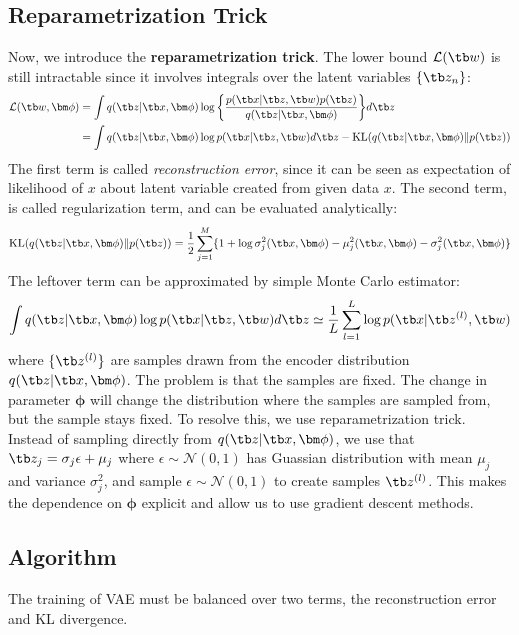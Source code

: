 \documentclass{article}
\begin{document}
    \subsection{Reparametrization Trick}
        Now, we introduce the \textbf{reparametrization trick}. The lower bound $\mathcal{L}(\tb w)$ is still intractable since it involves integrals over the latent
        variables $\{\tb z_n\}$:
        \begin{align*}
            \mathcal{L}(\tb w,\bm\phi)&=\int q(\tb z|\tb x, \bm\phi)\log{\left\{ \frac{p(\tb x|\tb z, \tb w)p(\tb z)}{q(\tb z|\tb x, \bm\phi)} \right\}}d\tb z
            \\ &=\int q(\tb z|\tb x,\bm\phi)\log{p(\tb x|\tb z,\tb w)}d\tb z - \text{KL}(q(\tb z|\tb x,\bm\phi)\|p(\tb z))
        \end{align*}
        The first term is called \emph{reconstruction error}, since it can be seen as expectation of likelihood of $x$ about latent variable created from given data $x$.
        The second term, is called regularization term, and can be evaluated analytically:
        \[
        \text{KL}(q(\tb z|\tb x,\bm\phi)\|p(\tb z))=\frac{1}{2}\sum_{j=1}^{M}\{1+\log{\sigma^2_j(\tb x, \bm\phi)}-\mu^2_j(\tb x,\bm\phi)-\sigma^2_j(\tb x,\bm\phi)\}
        \]
        The leftover term can be approximated by simple Monte Carlo estimator:
        \[
        \int q(\tb z|\tb x,\bm\phi)\log{p(\tb x|\tb z,\tb w)}d\tb z \simeq \frac{1}{L}\sum_{l=1}^{L}\log{p(\tb x|\tb z^{(l)}, \tb w)}
        \]
        where $\{\tb z^{(l)}\}$ are samples drawn from the encoder distribution $q(\tb z|\tb x, \bm\phi)$. The problem is that the samples are fixed.
        The change in parameter $\bm\phi$ will change the distribution where the samples are sampled from, but the sample stays fixed.
        To resolve this, we use reparametrization trick. Instead of sampling directly from $q(\tb z|\tb x,\bm\phi)$, we use
        that $\tb z_j = \sigma_j\epsilon + \mu_j$ where $\epsilon \sim \mathcal{N}(0,1)$ has Guassian distribution with
        mean $\mu_j$ and variance $\sigma_j^2$, and sample $\epsilon \sim \mathcal{N}(0,1)$ to create samples $\tb z^{(l)}$.
        This makes the dependence on $\bm\phi$ explicit and allow us to use gradient descent methods.
    \subsection{Algorithm}
        The training of VAE must be balanced over two terms, the reconstruction error and KL divergence.
        
\end{document}
